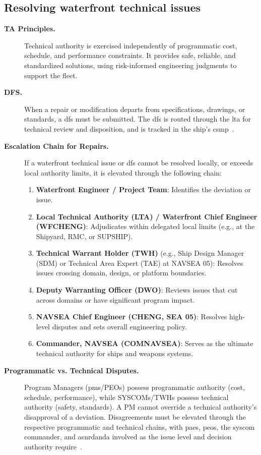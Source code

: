 \documentclass[../main.tex]{subfiles}
\begin{document}
\subsection{Resolving waterfront technical issues}
\begin{description}
  \item[\textbf{TA Principles.}] Technical authority is exercised independently of programmatic cost, schedule, and performance constraints. It provides safe, reliable, and standardized solutions, using risk-informed engineering judgments to support the fleet.
  \item[\textbf{DFS.}] When a repair or modification departs from specifications, drawings, or standards, a \ac{dfs} must be submitted. The \ac{dfs} is routed through the \ac{lta} for technical review and disposition, and is tracked in the ship's \ac{csmp}~\autocite{edo-2-1-5-technical-authority-2025}.
  \item[\textbf{Escalation Chain for Repairs.}] If a waterfront technical issue or \ac{dfs} cannot be resolved locally, or exceeds local authority limits, it is elevated through the following chain:
    \begin{enumerate}
      \item \textbf{Waterfront Engineer / Project Team}: Identifies the deviation or issue.
      \item \textbf{Local Technical Authority (LTA) / Waterfront Chief Engineer (WFCHENG)}: Adjudicates within delegated local limits (e.g., at the Shipyard, RMC, or SUPSHIP).
      \item \textbf{Technical Warrant Holder (TWH)} (e.g., Ship Design Manager (SDM) or Technical Area Expert (TAE) at NAVSEA 05): Resolves issues crossing domain, design, or platform boundaries.
      \item \textbf{Deputy Warranting Officer (DWO)}: Reviews issues that cut across domains or have significant program impact.
      \item \textbf{NAVSEA Chief Engineer (CHENG, SEA 05)}: Resolves high-level disputes and sets overall engineering policy.
      \item \textbf{Commander, NAVSEA (COMNAVSEA)}: Serves as the ultimate technical authority for ships and weapons systems.
    \end{enumerate}
  \item[\textbf{Programmatic vs. Technical Disputes.}] Program Managers (\acp{pm}/PEOs) possess programmatic authority (cost, schedule, performance), while SYSCOMs/TWHs possess technical authority (safety, standards). A PM cannot override a technical authority's disapproval of a deviation. Disagreements must be elevated through the respective programmatic and technical chains, with \acp{pae}, \acp{peo}, the \ac{syscom} commander, and \ac{asnrdanda} involved as the issue level and decision authority require~\autocite{SECNAV5400-15D,SECNAV5000-2G}.

\end{description}
\end{document}
